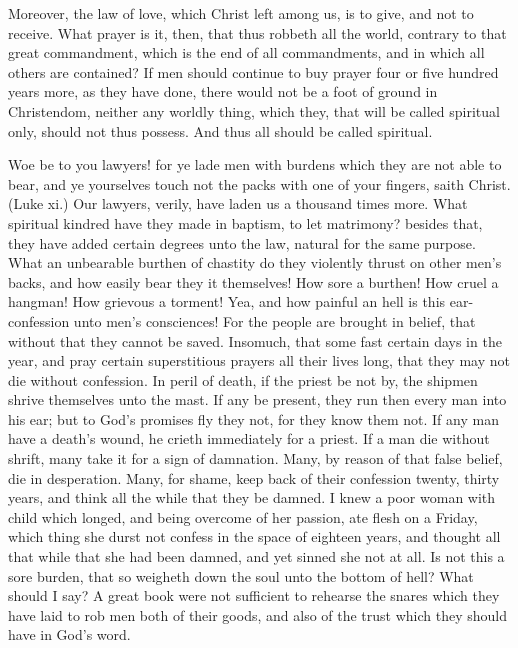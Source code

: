 Moreover, the law of love, which Christ left among us, 
is to give, and not to receive. What prayer is it, then, 
that thus robbeth all the world, contrary to that great 
commandment, which is the end of all commandments, 
and in which all others are contained? If men should 
continue to buy prayer four or five hundred years more, 
as they have done, there would not be a foot of ground in 
Christendom, neither any worldly thing, which they, that 
will be called spiritual only, should not thus possess. 
And thus all should be called spiritual. 

Woe be to you lawyers! for ye lade men with burdens 
which they are not able to bear, and ye yourselves touch 
not the packs with one of your fingers, saith Christ. 
(Luke xi.) Our lawyers, verily, have laden us a thousand
times more. What spiritual kindred have they 
made in baptism, to let matrimony? besides that, they 
have added certain degrees unto the law, natural for the 
same purpose. What an unbearable burthen of chastity 
do they violently thrust on other men's backs, and how 
easily bear they it themselves! How sore a burthen! 
How cruel a hangman! How grievous a torment! Yea, 
and how painful an hell is this ear-confession unto men's 
consciences! For the people are brought in belief, that 
without that they cannot be saved. Insomuch, that some 
fast certain days in the year, and pray certain superstitious 
prayers all their lives long, that they may not die without 
confession. In peril of death, if the priest be not by, the 
shipmen shrive themselves unto the mast. If any be 
present, they run then every man into his ear; but to 
God's promises fly they not, for they know them not. If 
any man have a death's wound, he crieth immediately for 
a priest. If a man die without shrift, many take it for a 
sign of damnation. Many, by reason of that false belief, 
die in desperation. Many, for shame, keep back of their 
confession twenty, thirty years, and think all the while 
that they be damned. I knew a poor woman with child 
which longed, and being overcome of her passion, ate 
flesh on a Friday, which thing she durst not confess in 
the space of eighteen years, and thought all that while 
that she had been damned, and yet sinned she not at all. 
Is not this a sore burden, that so weigheth down the soul 
unto the bottom of hell? What should I say? A great 
book were not sufficient to rehearse the snares which they 
have laid to rob men both of their goods, and also of the 
trust which they should have in God's word. 

